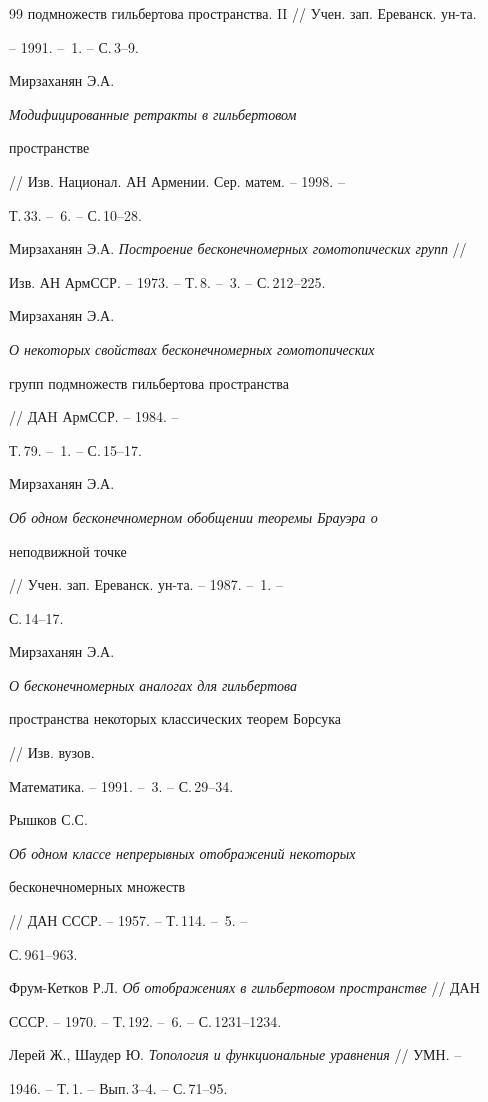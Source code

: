 \begin{thebibliography}{99}
{подмножеств гильбертова пространства}. II // Учен. зап. Ереванск. ун-та. 


-- 1991. -- \No\,1. -- С.\,3--9. 




Мирзаханян Э.А. {\em Модифицированные ретракты в гильбертовом 


пространстве} // Изв. Национал. АН Армении. Сер. матем. -- 1998. -- 


Т.\,33. -- \No\,6. -- С.\,10--28. 




Мирзаханян Э.А. {\em Построение бесконечномерных гомотопических групп} // 


Изв. АН АрмССР. -- 1973. -- Т.\,8. -- \No\,3. -- С.\,212--225. 




Мирзаханян Э.А. {\em О некоторых свойствах бесконечномерных гомотопических 


групп подмножеств гильбертова пространства} // ДАH АрмССР. -- 1984. -- 


Т.\,79. -- \No\,1. -- С.\,15--17. 




Мирзаханян Э.А. {\em Об одном бесконечномерном обобщении теоремы Брауэра о 


неподвижной точке} // Учен. зап. Ереванск. ун-та. -- 1987. -- \No\,1. -- 


С.\,14--17. 




Мирзаханян Э.А. {\em О бесконечномерных аналогах для гильбертова 


пространства некоторых классических теорем Борсука} // Изв. вузов. 


Математика. -- 1991. -- \No\,3. -- С.\,29--34. 




Рышков С.С. {\em Об одном классе непрерывных отображений некоторых 


бесконечномерных множеств} // ДАН СССР. -- 1957. -- Т.\,114. -- \No\,5. -- 


С.\,961--963. 




Фрум-Кетков Р.Л. {\em Об отображениях в гильбертовом пространстве} // ДАН 


СССР. -- 1970. -- Т.\,192. -- \No\,6. -- С.\,1231--1234. 




Лерей Ж., Шаудер Ю. {\em Топология и функциональные уравнения} // УМН. -- 


1946. -- Т.\,1. -- Вып.\,3--4. -- С.\,71--95. 


 


 


\end{thebibliography} 


 


\vskip 2cm 


 






 


\label{end} 


 


